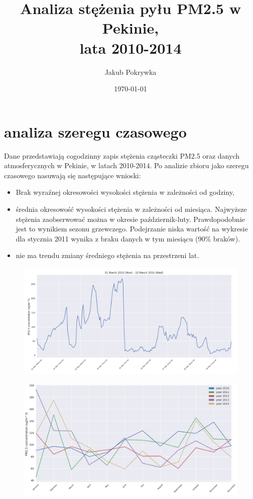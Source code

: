 \documentclass{beamer}
\title[analiza stężenia PM2.5]{Analiza stężenia pyłu PM2.5 w Pekinie, \\ lata 2010-2014}
\author{Jakub Pokrywka}
\institute[]
{\medskip
	\textit{jakubpokrywka@gmail.com} %
}
\date{\today}
\begin{document}
\begin{frame}
	\titlepage
\end{frame}

\section{analiza szeregu czasowego}
\begin{frame}
	Dane przedstawiają cogodzinny zapis stężenia cząsteczki PM2.5 oraz danych atmosferycznych w Pekinie, w latach 2010-2014.
	Po analizie zbioru jako szeregu czasowego nasuwają się następujące wnioski:
	\begin{itemize}
		\item Brak wyraźnej okresowości wysokości stężenia w zależności od godziny,
		\item średnia okresowość wysokości stężenia w zależności od miesiąca. Najwyższe stężenia zaobserwować można w okresie październik-luty.
			Prawdopodobnie jest to wynikiem sezonu grzewczego.
			Podejrzanie niska wartość na wykresie dla stycznia 2011 wynika z braku danych w tym miesiącu (90\% braków).
		\item nie ma trendu zmiany średniego stężenia na przestrzeni lat.
	\end{itemize}
\end{frame}

\begin{frame}
	\begin{figure}
		\includegraphics[width=1\linewidth]{time-period}
	\end{figure}
\end{frame}


\begin{frame}
	\begin{figure}
		\includegraphics[width=1\linewidth]{month-years}
	\end{figure}
\end{frame}
\end{document}
